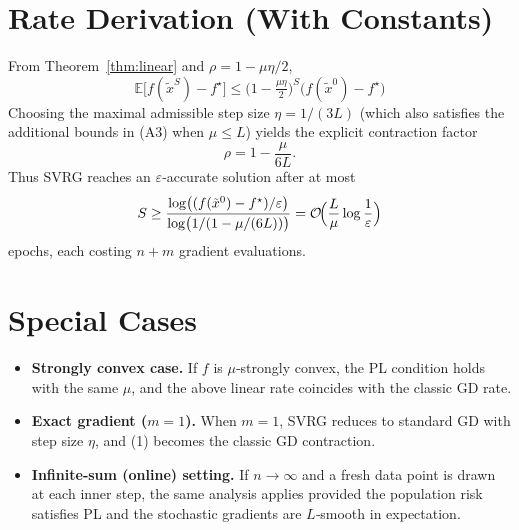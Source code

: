 \documentclass{article}
\newcommand{\E}{\mathbb{E}}
\begin{document}
\section*{Rate Derivation (With Constants)}
From Theorem~\ref{thm:linear} and $\rho=1-\mu\eta/2$,
\[
\boxed{\;
\E\!\bigl[f(\tilde{x}^{S})-f^{\star}\bigr]\le
\bigl(1-\tfrac{\mu\eta}{2}\bigr)^{S}\bigl(f(\tilde{x}^{0})-f^{\star}\bigr)
\;}
\]
Choosing the maximal admissible step size $\eta=1/(3L)$ (which also satisfies the
additional bounds in (A3) when $\mu\le L$) yields the explicit contraction factor
\[
\rho = 1-\frac{\mu}{6L}.
\]
Thus SVRG reaches an $\varepsilon$‑accurate solution after at most
\[
S\ge \frac{\log\bigl((f(\tilde{x}^{0})-f^{\star})/\varepsilon\bigr)}{\log\bigl(1/(1-\mu/(6L))\bigr)}
= \mathcal{O}\!\Bigl(\frac{L}{\mu}\log\frac{1}{\varepsilon}\Bigr)
\]
epochs, each costing $n+m$ gradient evaluations.

\section*{Special Cases}
\begin{itemize}
\item \textbf{Strongly convex case.} If $f$ is $\mu$‑strongly convex, the PL condition holds with the same $\mu$, and the above linear rate coincides with the classic GD rate.
\item \textbf{Exact gradient ($m=1$).} When $m=1$, SVRG reduces to standard GD with step size $\eta$, and (1) becomes the classic GD contraction.
\item \textbf{Infinite‑sum (online) setting.} If $n\to\infty$ and a fresh data point is drawn at each inner step, the same analysis applies provided the population risk satisfies PL and the stochastic gradients are $L$‑smooth in expectation.
\end{itemize}
\end{document}
